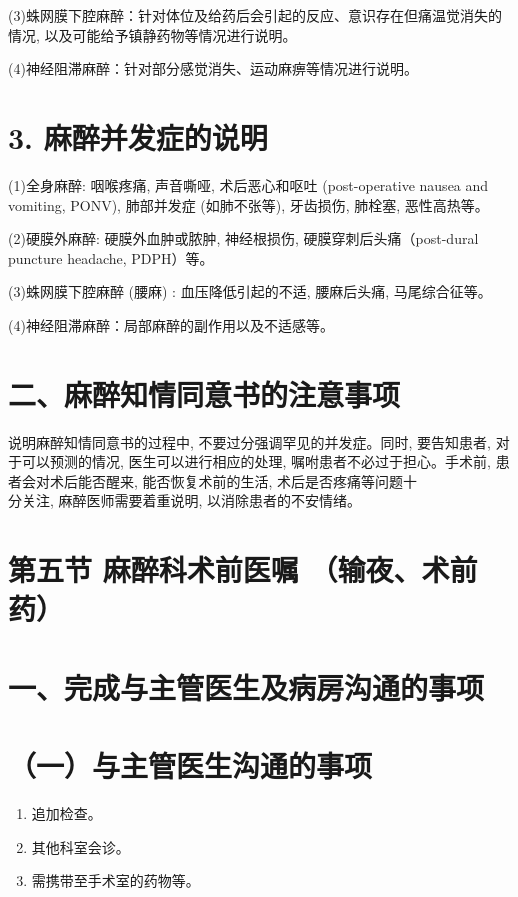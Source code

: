 \documentclass[10pt]{article}
\begin{document}
(3)蛛网膜下腔麻醉：针对体位及给药后会引起的反应、意识存在但痛温觉消失的情况, 以及可能给予镇静药物等情况进行说明。

(4)神经阻滞麻醉：针对部分感觉消失、运动麻痹等情况进行说明。

\section*{3. 麻醉并发症的说明}
(1)全身麻醉: 咽喉疼痛, 声音嘶哑, 术后恶心和呕吐 (post-operative nausea and vomiting, PONV), 肺部并发症 (如肺不张等), 牙齿损伤, 肺栓塞, 恶性高热等。

(2)硬膜外麻醉: 硬膜外血肿或脓肿, 神经根损伤, 硬膜穿刺后头痛（post-dural puncture headache, PDPH）等。

(3)蛛网膜下腔麻醉 (腰麻) : 血压降低引起的不适, 腰麻后头痛, 马尾综合征等。

(4)神经阻滞麻醉：局部麻醉的副作用以及不适感等。

\section*{二、麻醉知情同意书的注意事项}
说明麻醉知情同意书的过程中, 不要过分强调罕见的并发症。同时, 要告知患者, 对于可以预测的情况, 医生可以进行相应的处理, 嘱咐患者不必过于担心。手术前, 患者会对术后能否醒来, 能否恢复术前的生活, 术后是否疼痛等问题十\\
分关注, 麻醉医师需要着重说明, 以消除患者的不安情绪。

\section*{第五节 麻醉科术前医嘱 （输夜、术前药）}
\section*{一、完成与主管医生及病房沟通的事项}
\section*{（一）与主管医生沟通的事项}
\begin{enumerate}
  \item 追加检查。

  \item 其他科室会诊。

  \item 需携带至手术室的药物等。

\end{enumerate}
\end{document}
